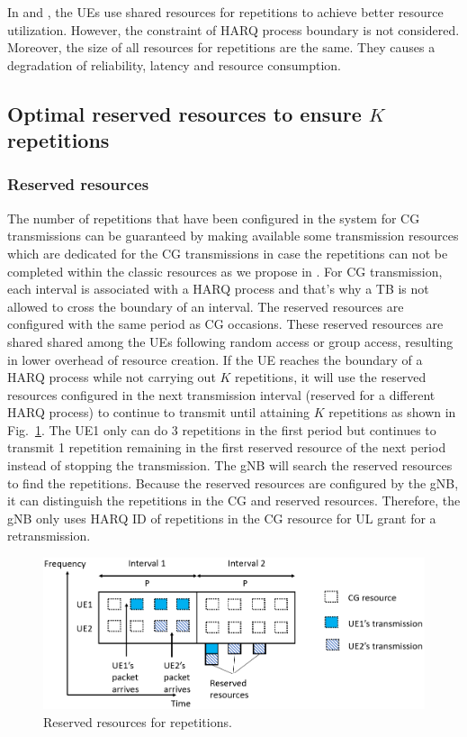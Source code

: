 \documentclass{ieeeaccess}
\begin{document}
In \cite{ref10} and \cite{ref11}, the UEs use shared resources for repetitions to achieve better resource utilization. However, the constraint of HARQ process boundary is not considered. Moreover, the size of all resources for repetitions are the same. They causes a degradation of reliability, latency and resource consumption.

\subsection{Optimal reserved resources to ensure $K$ repetitions}\label{IIIB}

\subsubsection {Reserved resources}

The number of repetitions that have been configured in the system for CG transmissions can be guaranteed by making available some transmission resources which are dedicated for the CG transmissions in case the repetitions can not be completed within the classic resources as we propose in \cite{b9}. For CG transmission, each interval is associated with a HARQ process and that's why a TB is not allowed to cross the boundary of an interval. The reserved resources are configured with the same period as CG occasions. These reserved resources are shared shared among the UEs following random access or group access, resulting in lower overhead of resource creation. If the UE reaches the boundary of a HARQ process while not carrying out $K$ repetitions, it will use the reserved resources configured in the next transmission interval (reserved for a different HARQ process) to continue to transmit until attaining $K$ repetitions as shown in Fig.~\ref{fig5}. The UE1 only can do 3 repetitions in the first period but continues to transmit 1 repetition remaining in the first reserved resource of the next period instead of stopping the transmission. The gNB will search the reserved resources to find the repetitions. Because the reserved resources are configured by the gNB, it can distinguish the repetitions in the CG and reserved resources. Therefore, the gNB only uses HARQ ID of repetitions in the CG resource for UL grant for a retransmission.

\begin{figure}[htbp]
\centerline{\includegraphics[scale=0.32]{fig5.PNG}}
\caption{Reserved resources for repetitions.}
\label{fig5}
\vspace{-2mm}
\end{figure}
\end{document}
